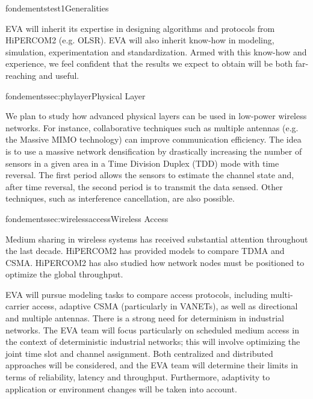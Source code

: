 \documentclass{ra2016}
\begin{document}
\begin{module}{fondements}{test1}{Generalities}

EVA will inherit its expertise in designing  algorithms and protocols  from HiPERCOM2 (e.g. OLSR). EVA will 
also  inherit know-how in modeling, simulation, experimentation and standardization. Armed with this know-how and experience, we feel confident that the results we expect to obtain will be both far-reaching and useful.

\end{module}

\begin{module}{fondements}{sec:phylayer}{Physical Layer}

We plan to study how advanced physical layers can be used in low-power wireless networks. For instance, collaborative techniques such as multiple antennas (e.g. the Massive MIMO
technology) can improve communication efficiency.   
The idea is to use a massive network densification by drastically increasing
the number of sensors in a given area in a Time Division
Duplex (TDD) mode with time reversal. The first
period allows the sensors to estimate the channel state and, after 
time reversal, the second period is to transmit the data sensed.
Other techniques, such as interference cancellation, are also possible.
\end{module}

\begin{module}{fondements}{sec:wirelessaccess}{Wireless Access}

Medium sharing in wireless systems has received substantial attention throughout the last decade. HiPERCOM2 has provided models to compare TDMA and CSMA. HiPERCOM2 has also studied how network nodes must be positioned to optimize the global throughput.

EVA will pursue modeling tasks to compare access protocols, including multi-carrier access, adaptive CSMA (particularly in VANETs), as well as directional and multiple antennas. There is a strong need for determinism in industrial networks. The EVA team will focus particularly on scheduled medium access in the context of deterministic industrial networks; this will involve optimizing the joint time slot and channel assignment. Both centralized and distributed approaches will be considered, and the EVA team will determine their limits in terms of reliability, latency and throughput. Furthermore, adaptivity to application or environment changes will be taken into account.

\end{module}
\end{document}
